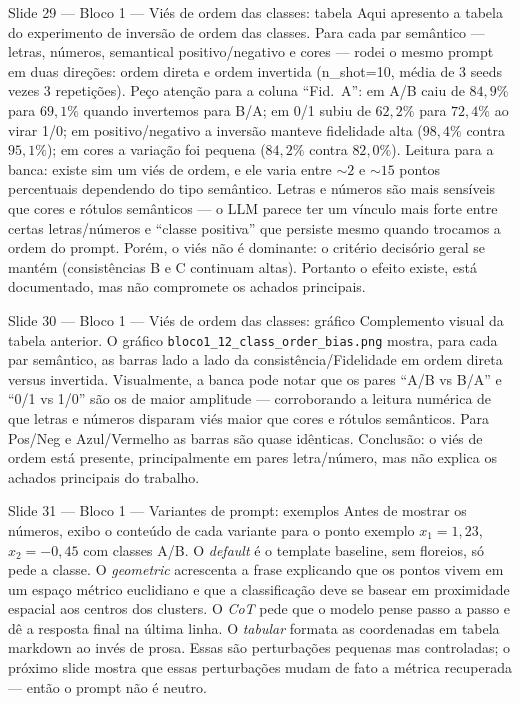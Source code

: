 \documentclass[aspectratio=169,10pt]{beamer}
\begin{document}
\begin{frame}{Slide 29 --- Bloco 1 --- Vi\'es de ordem das classes: tabela}
\footnotesize
Aqui apresento a tabela do experimento de invers\~ao de ordem das classes. Para cada par sem\^antico --- letras, n\'umeros, semantical positivo/negativo e cores --- rodei o mesmo prompt em duas dire\c{c}\~oes: ordem direta e ordem invertida (n\_shot=10, m\'edia de 3 seeds vezes 3 repeti\c{c}\~oes). Pe\c{c}o aten\c{c}\~ao para a coluna ``Fid.\ A'': em A/B caiu de $84{,}9\%$ para $69{,}1\%$ quando invertemos para B/A; em 0/1 subiu de $62{,}2\%$ para $72{,}4\%$ ao virar 1/0; em positivo/negativo a invers\~ao manteve fidelidade alta ($98{,}4\%$ contra $95{,}1\%$); em cores a varia\c{c}\~ao foi pequena ($84{,}2\%$ contra $82{,}0\%$). Leitura para a banca: existe sim um vi\'es de ordem, e ele varia entre $\sim 2$ e $\sim 15$ pontos percentuais dependendo do tipo sem\^antico. Letras e n\'umeros s\~ao mais sens\'iveis que cores e r\'otulos sem\^anticos --- o LLM parece ter um v\'inculo mais forte entre certas letras/n\'umeros e ``classe positiva'' que persiste mesmo quando trocamos a ordem do prompt. Por\'em, o vi\'es n\~ao \'e dominante: o critério decis\'orio geral se mant\'em (consist\^encias B e C continuam altas). Portanto o efeito existe, est\'a documentado, mas n\~ao compromete os achados principais.
\end{frame}

\begin{frame}{Slide 30 --- Bloco 1 --- Vi\'es de ordem das classes: gr\'afico}
\footnotesize
Complemento visual da tabela anterior. O gr\'afico \texttt{bloco1\_12\_class\_order\_bias.png} mostra, para cada par sem\^antico, as barras lado a lado da consist\^encia/Fidelidade em ordem direta versus invertida. Visualmente, a banca pode notar que os pares ``A/B vs B/A'' e ``0/1 vs 1/0'' s\~ao os de maior amplitude --- corroborando a leitura num\'erica de que letras e n\'umeros disparam vi\'es maior que cores e r\'otulos sem\^anticos. Para Pos/Neg e Azul/Vermelho as barras s\~ao quase id\^enticas. Conclus\~ao: o vi\'es de ordem est\'a presente, principalmente em pares letra/n\'umero, mas n\~ao explica os achados principais do trabalho.
\end{frame}

\begin{frame}{Slide 31 --- Bloco 1 --- Variantes de prompt: exemplos}
\footnotesize
Antes de mostrar os n\'umeros, exibo o conte\'udo de cada variante para o ponto exemplo $x_1=1{,}23$, $x_2=-0{,}45$ com classes A/B. O \emph{default} \'e o template baseline, sem floreios, s\'o pede a classe. O \emph{geometric} acrescenta a frase explicando que os pontos vivem em um espa\c{c}o m\'etrico euclidiano e que a classifica\c{c}\~ao deve se basear em proximidade espacial aos centros dos clusters. O \emph{CoT} pede que o modelo pense passo a passo e d\^e a resposta final na \'ultima linha. O \emph{tabular} formata as coordenadas em tabela markdown ao inv\'es de prosa. Essas s\~ao perturba\c{c}\~oes pequenas mas controladas; o pr\'oximo slide mostra que essas perturba\c{c}\~oes mudam de fato a m\'etrica recuperada --- ent\~ao o prompt n\~ao \'e neutro.
\end{frame}
\end{document}
